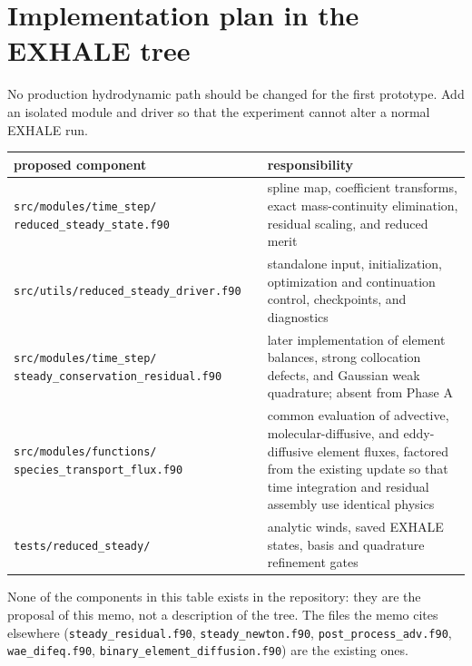 \documentclass[english,a4paper]{my_memo}
\newcommand{\code}[1]{\texttt{#1}}
\begin{document}
\section{Implementation plan in the EXHALE tree}\label{sec:implementation}

No production hydrodynamic path should be changed for the first prototype.
Add an isolated module and driver so that the experiment cannot alter a normal
EXHALE run.

\begin{center}\small
\begin{tabular}{@{}p{}p{}@{}}
\toprule
proposed component & responsibility \\
\midrule
\code{src/modules/time\_step/}\newline
\code{reduced\_steady\_state.f90} & spline map,
  coefficient transforms, exact mass-continuity elimination, residual scaling,
  and reduced merit \\
\code{src/utils/reduced\_steady\_driver.f90} & standalone input, initialization,
  optimization and continuation control, checkpoints, and diagnostics \\
\code{src/modules/time\_step/}\newline
\code{steady\_conservation\_residual.f90} & later implementation
  of element balances, strong collocation defects, and Gaussian weak
  quadrature; absent from Phase A \\
\code{src/modules/functions/}\newline
\code{species\_transport\_flux.f90} & common evaluation of advective,
  molecular-diffusive, and eddy-diffusive element fluxes, factored from the
  existing update so that time integration and residual assembly use identical
  physics \\
\code{tests/reduced\_steady/} & analytic winds, saved EXHALE states, basis and
  quadrature refinement gates \\
\bottomrule
\end{tabular}
\end{center}

\noindent None of the components in this table exists in the repository: they
are the proposal of this memo, not a description of the tree.  The files the
memo cites elsewhere (\code{steady\_residual.f90},
\code{steady\_newton.f90}, \code{post\_process\_adv.f90},
\code{wae\_difeq.f90}, \code{binary\_element\_diffusion.f90}) are the
existing ones.
\end{document}
